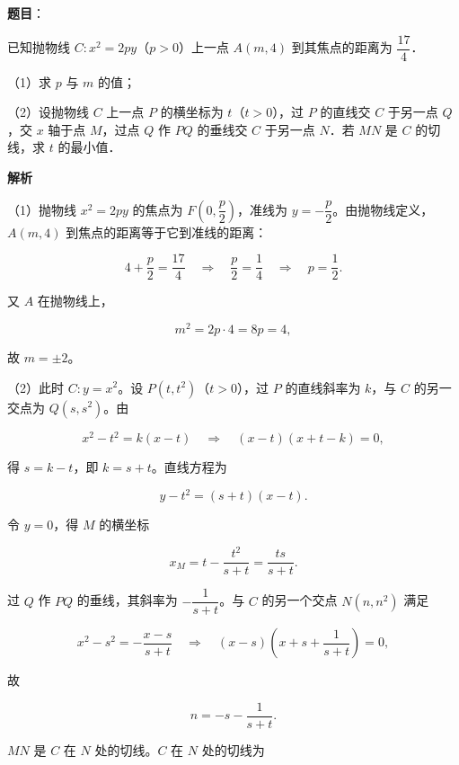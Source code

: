 \begin{answer}

\textbf{题目}：

已知抛物线 $C:x^2=2py$（$p>0$）上一点 $A(m,4)$ 到其焦点的距离为 $\dfrac{17}{4}$．

（1）求 $p$ 与 $m$ 的值；

（2）设抛物线 $C$ 上一点 $P$ 的横坐标为 $t$（$t>0$），过 $P$ 的直线交 $C$ 于另一点 $Q$，交 $x$ 轴于点 $M$，过点 $Q$ 作 $PQ$ 的垂线交 $C$ 于另一点 $N$．若 $MN$ 是 $C$ 的切线，求 $t$ 的最小值．
\nopagebreak[4]
\begin{center}\end{center}
\nopagebreak[4]
\textbf{解析}

（1）抛物线 $x^2=2py$ 的焦点为 $F\left(0,\dfrac p2\right)$，准线为 $y=-\dfrac p2$。由抛物线定义，$A(m,4)$ 到焦点的距离等于它到准线的距离：

\nopagebreak[4]
\[4+\frac p2=\frac{17}{4}\quad\Longrightarrow\quad\frac p2=\frac14\quad\Longrightarrow\quad p=\frac12.\]

又 $A$ 在抛物线上，

\nopagebreak[4]
\[m^2=2p\cdot4=8p=4,\]

故 $m=\pm2$。

（2）此时 $C:y=x^2$。设 $P(t,t^2)$（$t>0$），过 $P$ 的直线斜率为 $k$，与 $C$ 的另一交点为 $Q(s,s^2)$。由

\nopagebreak[4]
\[x^2-t^2=k(x-t)\quad\Longrightarrow\quad(x-t)(x+t-k)=0,\]

得 $s=k-t$，即 $k=s+t$。直线方程为

\nopagebreak[4]
\[y-t^2=(s+t)(x-t).\]

令 $y=0$，得 $M$ 的横坐标

\nopagebreak[4]
\[x_M=t-\frac{t^2}{s+t}=\frac{ts}{s+t}.\]

过 $Q$ 作 $PQ$ 的垂线，其斜率为 $-\dfrac1{s+t}$。与 $C$ 的另一个交点 $N(n,n^2)$ 满足

\nopagebreak[4]
\[x^2-s^2=-\frac{x-s}{s+t}
\quad\Longrightarrow\quad
(x-s)\left(x+s+\frac1{s+t}\right)=0,\]

故

\nopagebreak[4]
\[n=-s-\frac1{s+t}.\]

$MN$ 是 $C$ 在 $N$ 处的切线。$C$ 在 $N$ 处的切线为


\end{answer}

